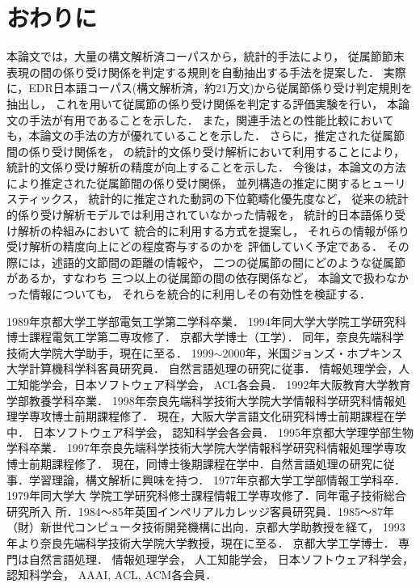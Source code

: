 \section{おわりに}

本論文では，大量の構文解析済コーパスから，統計的手法により，
従属節節末表現の間の係り受け関係を判定する規則を自動抽出する手法を提案した．
実際に，EDR日本語コーパス\cite{EDR95aj-nlp}(構文解析済，約21万文)から従属節係り受け判定規則を抽出し，
これを用いて従属節の係り受け関係を判定する評価実験を行い，
本論文の手法が有用であることを示した．
また，関連手法との性能比較においても，本論文の手法の方が優れていることを示した．
さらに，推定された従属節間の係り受け関係を，
\cite{Fujio97aj,Fujio99aj}の統計的文係り受け解析において利用することにより，
統計的文係り受け解析の精度が向上することを示した．
今後は，本論文の方法により推定された従属節間の係り受け関係，
並列構造の推定に関するヒューリスティックス\cite{Kurohashi92cj}，
統計的に推定された動詞の下位範疇化優先度\cite{Utsuro98b}など，
従来の統計的係り受け解析モデルでは利用されていなかった情報を，
統計的日本語係り受け解析の枠組みにおいて
統合的に利用する方式を提案し，
それらの情報が係り受け解析の精度向上にどの程度寄与するのかを
評価していく予定である．
その際には，述語的文節間の距離の情報や，
二つの従属節の間にどのような従属節があるか，すなわち
三つ以上の従属節の間の依存関係など，
本論文で扱わなかった情報についても，
それらを統合的に利用しその有効性を検証する．







\begin{biography}
{1989年京都大学工学部電気工学第二学科卒業．
1994年同大学大学院工学研究科博士課程電気工学第二専攻修了．
京都大学博士（工学）．
同年，奈良先端科学技術大学院大学助手，現在に至る．
1999$\sim$2000年，米国ジョンズ・ホプキンス大学計算機科学科客員研究員．
自然言語処理の研究に従事．
情報処理学会，人工知能学会，日本ソフトウェア科学会，
ACL各会員．
}
{
1992年大阪教育大学教育学部教養学科卒業．
1998年奈良先端科学技術大学院大学情報科学研究科情報処理学専攻博士前期課程修了．
現在，大阪大学言語文化研究科博士前期課程在学中．
日本ソフトウェア科学会，
認知科学会各会員．
}
{1995年京都大学理学部生物学科卒業．
1997年奈良先端科学技術大学院大学情報科学研究科情報処理学専攻博士前期課程修了．
現在，同博士後期課程在学中．自然言語処理の研究に従事．学習理論，構文解析に興味を持つ．
}
{
1977年京都大学工学部情報工学科卒．1979年同大学大
学院工学研究科修士課程情報工学専攻修了．同年電子技術総合研究所入
所．1984〜85年英国インペリアルカレッジ客員研究員．1985〜87年
（財）新世代コンピュータ技術開発機構に出向．京都大学助教授を経て，
1993年より奈良先端科学技術大学院大学教授，現在に至る．
京都大学工学博士．
専門は自然言語処理．
情報処理学会，
人工知能学会，
日本ソフトウェア科学会，
認知科学会，
AAAI, ACL, ACM各会員．
}

\end{biography}



